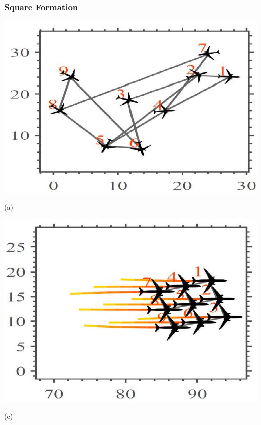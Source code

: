 \documentclass[10pt]{article}
\begin{document}
\subsubsection{Square Formation}
\begin{center}
\includegraphics[max width=\textwidth]{2023_10_07_53b70c7408bc8e139415g-36(3)}
\end{center}

(a)

\begin{center}
\includegraphics[max width=\textwidth]{2023_10_07_53b70c7408bc8e139415g-36(2)}
\end{center}

(c)
\end{document}
